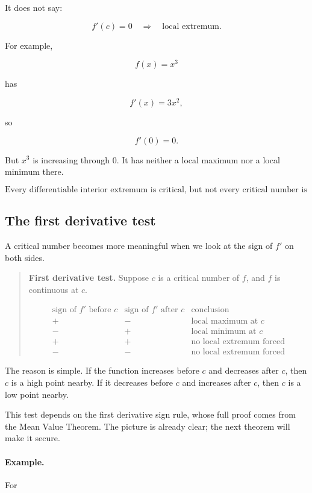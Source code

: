 It does not say:

\[
f'(c)=0
\quad\Longrightarrow\quad
\text{local extremum}.
\]

For example,

\[
f(x)=x^3
\]

has

\[
f'(x)=3x^2,
\]

so

\[
f'(0)=0.
\]

But \(x^3\) is increasing through \(0\).  It has neither a local maximum nor a local
minimum there.

\[
\boxed{
\text{Every differentiable interior extremum is critical, but not every critical number is an extremum.}
}
\]

\subsection{The first derivative test}
\label{subsec:first-derivative-test}

A critical number becomes more meaningful when we look at the sign of \(f'\) on
both sides.

\begin{quote}
\textbf{First derivative test.}
Suppose \(c\) is a critical number of \(f\), and \(f\) is continuous at \(c\).

\[
\begin{array}{c|c|c}
\text{sign of } f' \text{ before } c & \text{sign of } f' \text{ after } c & \text{conclusion} \\ \hline
+ & - & \text{local maximum at } c \\
- & + & \text{local minimum at } c \\
+ & + & \text{no local extremum forced} \\
- & - & \text{no local extremum forced}
\end{array}
\]
\end{quote}

The reason is simple.  If the function increases before \(c\) and decreases after
\(c\), then \(c\) is a high point nearby.  If it decreases before \(c\) and increases
after \(c\), then \(c\) is a low point nearby.

This test depends on the first derivative sign rule, whose full proof comes from the
Mean Value Theorem.  The picture is already clear; the next theorem will make it
secure.

\paragraph{Example.}
For

